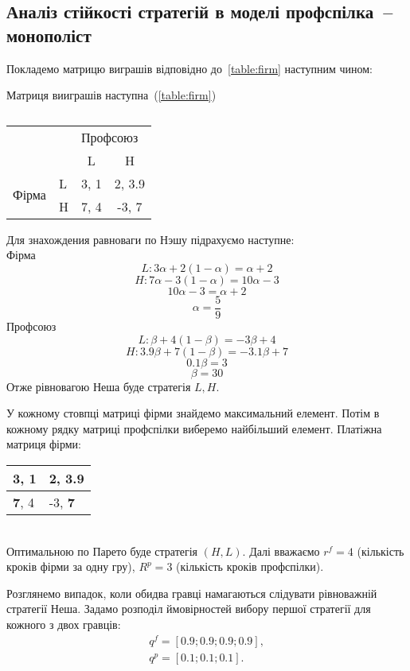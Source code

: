 \subsection{Аналіз стійкості стратегій в моделі профспілка~-- монополіст}
Покладемо матрицю виграшів відповідно до~\ref{table:firm} наступним чином:
\newpage
\begin{table}[h]
	
	\centering
	\caption{}
	Матриця вииграшів наступна~(\ref{table:firm})\\
	\normalsize
\begin{tabular}{|l|l|c|c|}
	\hline
	\multicolumn{2}{|l|}{\multirow{2}{*}{}} & \multicolumn{2}{l|}{Профсоюз} \\ \cline{3-4} 
	\multicolumn{2}{|l|}{}                  & L            & H              \\ \hline
	\multirow{2}{*}{Фірма}        & L       & 3, 1         & 2, 3.9         \\ \cline{2-4} 
	& H       & 7, 4         & -3, 7          \\ \hline
\end{tabular}
	\label{table:mono:ex}
\end{table}
Для знахождения равноваги по Нэшу підрахуємо наступне: \\
Фірма
	$$ L:  3\alpha + 2(1-\alpha)=\alpha + 2$$
	$$ H: 7\alpha - 3(1-\alpha)=10\alpha - 3$$
	$$10\alpha - 3 = \alpha+2 $$
	$$\alpha = \frac{5}{9} $$
Профсоюз	
	 $$L: \beta + 4(1-\beta)=-3\beta + 4$$
	 $$H: 3.9\beta + 7(1-\beta)=-3.1\beta +7$$
	$$0.1\beta  = 3 $$
	$$\beta = 30 $$
Отже рівновагою Неша буде стратегія $L,H$.

У кожному стовпці матриці фірми знайдемо максимальний елемент.
Потім в кожному рядку матриці профспілки виберемо найбільший елемент.
Платіжна матриця фірми:
\begin{table}[h]
	\centering
	\begin{tabular}{|l|l|}
		\hline
		3, 1 & \textbf{2, 3.9}  \\ \hline
		\textbf{7}, 4 & -3, \textbf{7} \\ \hline
	\end{tabular}
\end{table}\\
Оптимальною по Парето буде стратегія $ (H, L) $. Далі вважаємо $ r^f = 4 $ (кількість кроків фірми за одну гру), $ R^p = 3 $ (кількість кроків профспілки). 

 Розглянемо випадок, коли обидва гравці намагаються слідувати рівноважній стратегії
  Неша. Задамо розподіл ймовірностей вибору першої стратегії для
  кожного з двох гравців:
 \begin{gather*}
 	q^f = \left[ 0.9; 0.9; 0.9; 0.9 \right], \\
 	q^p = \left[ 0.1; 0.1; 0.1 \right].
 \end{gather*}

